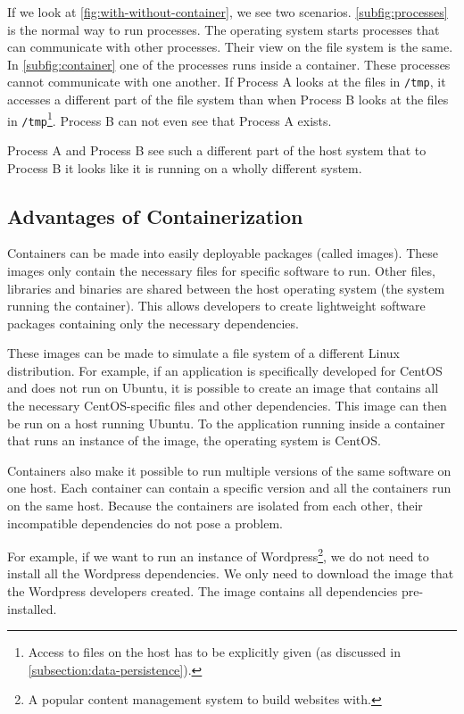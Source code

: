 If we look at \autoref{fig:with-without-container}, we see two scenarios. \autoref{subfig:processes} is the normal way to run processes. The operating system starts processes that can communicate with other processes. Their view on the file system is the same.
In \autoref{subfig:container} one of the processes runs inside a container. These processes cannot communicate with one another. If Process A looks at the files in \lstinline{/tmp}, it accesses a different part of the file system than when Process B looks at the files in \lstinline{/tmp}\footnote{Access to files on the host has to be explicitly given (as discussed in \autoref{subsection:data-persistence}).}. Process B can not even see that Process A exists.

\medskip

Process A and Process B see such a different part of the host system that to Process B it looks like it is running on a wholly different system.

\subsection{Advantages of Containerization}
Containers can be made into easily deployable packages (called images). These images only contain the necessary files for specific software to run. Other files, libraries and binaries are shared between the host operating system (the system running the container). This allows developers to create lightweight software packages containing only the necessary dependencies.

These images can be made to simulate a file system of a different Linux distribution. For example, if an application is specifically developed for CentOS and does not run on Ubuntu, it is possible to create an image that contains all the necessary CentOS-specific files and other dependencies. This image can then be run on a host running Ubuntu. To the application running inside a container that runs an instance of the image, the operating system is CentOS\@.

\medskip

Containers also make it possible to run multiple versions of the same software on one host. Each container can contain a specific version and all the containers run on the same host. Because the containers are isolated from each other, their incompatible dependencies do not pose a problem.

\medskip

For example, if we want to run an instance of Wordpress\footnote{A popular content management system to build websites with.}, we do not need to install all the Wordpress dependencies. We only need to download the image that the Wordpress developers created. The image contains all dependencies pre-installed.

